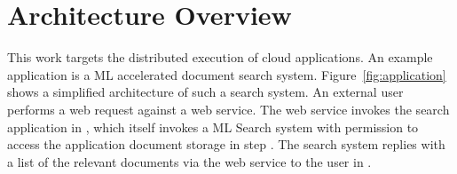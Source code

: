 \section{Architecture Overview}
This work targets the distributed execution of cloud applications. An example application is a \ac{ML} accelerated document search system. Figure~\ref{fig:application} shows a simplified architecture of such a search system. An external user performs a web request against a web service. The web service invokes the search application in , which itself invokes a \ac{ML} Search system with permission to access the application document storage in step . The search system replies with a list of the relevant documents via the web service to the user in .

